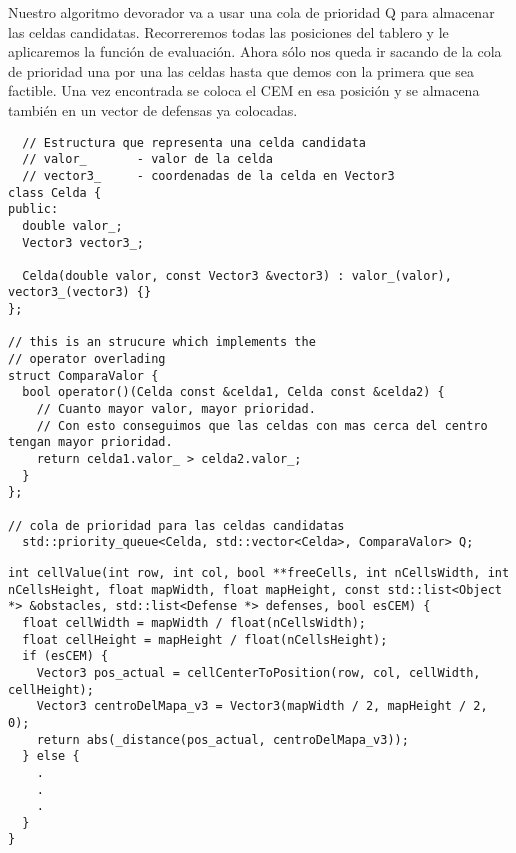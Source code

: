 Nuestro algoritmo devorador va a usar una cola de prioridad Q para almacenar las celdas candidatas.
Recorreremos todas las posiciones del tablero y le aplicaremos la función de evaluación.
Ahora sólo nos queda ir sacando de la cola de prioridad una por una las celdas hasta que demos con la primera que sea factible. Una vez encontrada se coloca el CEM en esa posición y se almacena también en un vector de defensas ya colocadas.

\begin{lstlisting}
  // Estructura que representa una celda candidata
  // valor_       - valor de la celda
  // vector3_     - coordenadas de la celda en Vector3
class Celda {
public:
  double valor_;
  Vector3 vector3_;

  Celda(double valor, const Vector3 &vector3) : valor_(valor), vector3_(vector3) {}
};

// this is an strucure which implements the
// operator overlading 
struct ComparaValor {
  bool operator()(Celda const &celda1, Celda const &celda2) {
    // Cuanto mayor valor, mayor prioridad.
    // Con esto conseguimos que las celdas con mas cerca del centro tengan mayor prioridad. 
    return celda1.valor_ > celda2.valor_;
  }
};

// cola de prioridad para las celdas candidatas
  std::priority_queue<Celda, std::vector<Celda>, ComparaValor> Q; 

\end{lstlisting}

\begin{lstlisting}
int cellValue(int row, int col, bool **freeCells, int nCellsWidth, int nCellsHeight, float mapWidth, float mapHeight, const std::list<Object *> &obstacles, std::list<Defense *> defenses, bool esCEM) {
  float cellWidth = mapWidth / float(nCellsWidth);
  float cellHeight = mapHeight / float(nCellsHeight);
  if (esCEM) {
    Vector3 pos_actual = cellCenterToPosition(row, col, cellWidth, cellHeight);
    Vector3 centroDelMapa_v3 = Vector3(mapWidth / 2, mapHeight / 2, 0);
    return abs(_distance(pos_actual, centroDelMapa_v3));
  } else {
    .
    .
    .
  }
}
\end{lstlisting}


